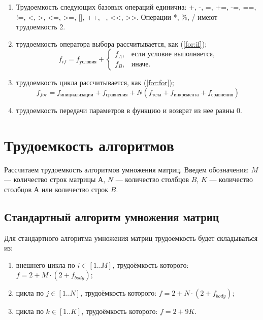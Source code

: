 \begin{enumerate}[label=\arabic*)]
	\item Трудоемкость следующих базовых операций единична:
	+, -, =, +=, -=, ==, !=, <, >, <=, >=, [], ++, --, <<, >>.
	Операции *, \%, / имеют трудоемкость 2.
	\item трудоемкость оператора выбора  рассчитывается, как (\ref{for:if});
	\begin{equation}
		\label{for:if}
		f_{if} = f_{\text{условия}} +
		\begin{cases}
			f_A, & \text{если условие выполняется,}\\
			f_B, & \text{иначе.}
		\end{cases}
	\end{equation}
	\item трудоемкость цикла рассчитывается, как (\ref{for:for});
	\begin{equation}
		\label{for:for}
		f_{for} = f_{\text{инициализации}} + f_{\text{сравнения}} + N(f_{\text{тела}} + f_{\text{инкремента}} + f_{\text{сравнения}})
	\end{equation}
	\item трудоемкость передачи параметров в функцию и возврат из нее равны 0.
\end{enumerate}


\section{Трудоемкость алгоритмов}

Рассчитаем трудоемкость алгоритмов умножения матриц. Введем обозначения: $M$ --- количество строк матрицы $А$, $N$ --- количество столбцов $B$, $K$ --- количество столбцов $А$ или количество строк $B$.

\subsection{Стандартный алгоритм умножения матриц}

Для стандартного алгоритма умножения матриц трудоемкость будет складываться из:

\begin{enumerate}[label=\arabic*)]
	\item внешнего цикла по $i \in [1..M]$, трудоёмкость которого: $f = 2 + M \cdot (2 + f_{body})$;
	\item цикла по $j \in [1..N]$, трудоёмкость которого: $f = 2 + N \cdot (2 + f_{body})$;
	\item цикла по $k \in [1..K]$, трудоёмкость которого: $f = 2 + 9K$. \newline
\end{enumerate}

